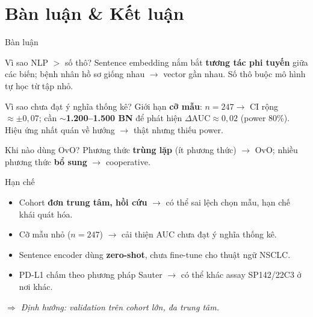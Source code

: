 \documentclass[aspectratio=169,11pt]{beamer}
\begin{document}
\section{Bàn luận \& Kết luận}

\begin{frame}{Bàn luận}
  \begin{block}{Vì sao NLP $>$ số thô?}
    Sentence embedding nắm bắt \textbf{tương tác phi tuyến} giữa các biến; bệnh nhân hồ sơ giống nhau $\rightarrow$ vector gần nhau. Số thô buộc mô hình tự học từ tập nhỏ.
  \end{block}
  \begin{block}{Vì sao chưa đạt ý nghĩa thống kê?}
    Giới hạn \textbf{cỡ mẫu}: $n=247 \rightarrow$ CI rộng $\approx\pm0{,}07$; cần \textbf{$\sim$1.200–1.500 BN} để phát hiện $\Delta$AUC$\approx0{,}02$ (power 80\%). Hiệu ứng nhất quán về hướng $\rightarrow$ thật nhưng thiếu power.
  \end{block}
  \begin{block}{Khi nào dùng OvO?}
    Phương thức \textbf{trùng lặp} (ít phương thức) $\rightarrow$ OvO; nhiều phương thức \textbf{bổ sung} $\rightarrow$ cooperative.
  \end{block}
\end{frame}

\begin{frame}{Hạn chế}
  \begin{itemize}
    \item Cohort \textbf{đơn trung tâm, hồi cứu} $\rightarrow$ có thể sai lệch chọn mẫu, hạn chế khái quát hóa.
    \item Cỡ mẫu nhỏ ($n=247$) $\rightarrow$ cải thiện AUC chưa đạt ý nghĩa thống kê.
    \item Sentence encoder dùng \textbf{zero-shot}, chưa fine-tune cho thuật ngữ NSCLC.
    \item PD-L1 chấm theo phương pháp Sauter $\rightarrow$ có thể khác assay SP142/22C3 ở nơi khác.
  \end{itemize}
  \vfill
  \footnotesize\textit{$\Rightarrow$ Định hướng: validation trên cohort lớn, đa trung tâm.}
\end{frame}
\end{document}
